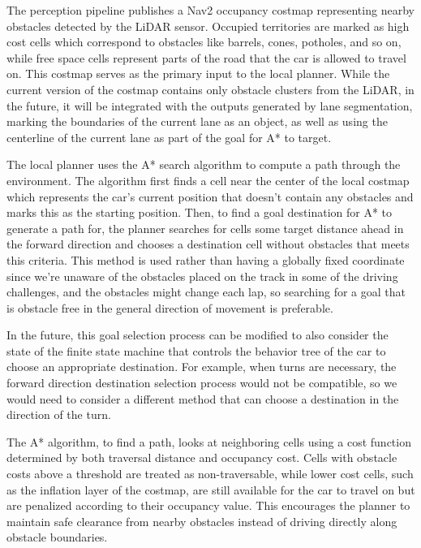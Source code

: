 The perception pipeline publishes a Nav2 occupancy costmap representing nearby obstacles detected by the LiDAR sensor. Occupied territories are marked as high cost cells which correspond to obstacles like barrels, cones, potholes, and so on, while free space cells represent parts of the road that the car is allowed to travel on. This costmap serves as the primary input to the local planner. While the current version of the costmap contains only obstacle clusters from the LiDAR, in the future, it will be integrated with the outputs generated by lane segmentation, marking the boundaries of the current lane as an object, as well as using the centerline of the current lane as part of the goal for A* to target.

The local planner uses the A* search algorithm to compute a path through the environment. The algorithm first finds a cell near the center of the local costmap which represents the car’s current position that doesn’t contain any obstacles and marks this as the starting position. Then, to find a goal destination for A* to generate a path for, the planner searches for cells some target distance ahead in the forward direction and chooses a destination cell without obstacles that meets this criteria. This method is used rather than having a globally fixed coordinate since we’re unaware of the obstacles placed on the track in some of the driving challenges, and the obstacles might change each lap, so searching for a goal that is obstacle free in the general direction of movement is preferable.

In the future, this goal selection process can be modified to also consider the state of the finite state machine that controls the behavior tree of the car to choose an appropriate destination. For example, when turns are necessary, the forward direction destination selection process would not be compatible, so we would need to consider a different method that can choose a destination in the direction of the turn.

The A* algorithm, to find a path, looks at neighboring cells using a cost function determined by both traversal distance and occupancy cost. Cells with obstacle costs above a threshold are treated as non-traversable, while lower cost cells, such as the inflation layer of the costmap, are still available for the car to travel on but are penalized according to their occupancy value. This encourages the planner to maintain safe clearance from nearby obstacles instead of driving directly along obstacle boundaries.

